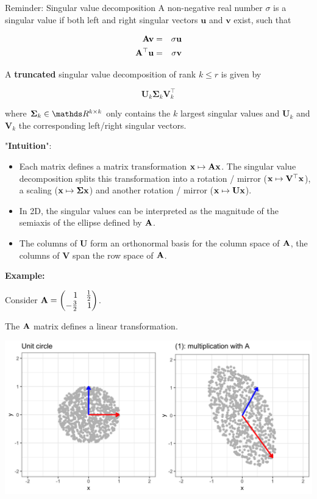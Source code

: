 \documentclass[11pt,compress,t,notes=noshow, xcolor=table]{beamer}
\begin{document}
\begin{vbframe}{Reminder: Singular value decomposition}
A non-negative real number $\sigma$ is a singular value if both left and right singular vectors $\mathbf{u}$ and $\mathbf{v}$ exist, such that

\begin{eqnarray*}
\mathbf{A} \mathbf{v} &=& \sigma \mathbf{u} \\
\mathbf{A}^\top \mathbf{u} &=& \sigma \mathbf{v}
\end{eqnarray*}


\framebreak

A \textbf{truncated} singular value decomposition of rank $k \le r$ is given by

$$
\mathbf{U}_k \boldsymbol{\Sigma}_k \mathbf{V}_k^\top
$$

where $\boldsymbol{\Sigma}_k \in \R^{k \times k}$ only contains the $k$ largest singular values and $\mathbf{U}_k$ and $\mathbf{V}_k$ the corresponding left/right singular vectors.

\framebreak

"\textbf{Intuition}":

\begin{itemize}
\item Each matrix defines a matrix transformation $\mathbf{x} \mapsto \mathbf{A} \mathbf{x}$. The singular value decomposition splits this transformation into a rotation / mirror ($\mathbf{x} \mapsto \mathbf{V}^\top \mathbf{x}$), a scaling ($\mathbf{x} \mapsto \boldsymbol{\Sigma} \mathbf{x}$) and another rotation / mirror ($\mathbf{x} \mapsto \mathbf{U}\mathbf{x}$).
\item In 2D, the singular values can be interpreted as the magnitude of the semiaxis of the ellipse defined by $\mathbf{A}$.
\item The columns of $\mathbf{U}$ form an orthonormal basis for the column space of $\mathbf{A}$, the columns of $\mathbf{V}$ span the row space of $\mathbf{A}$.
\end{itemize}

\framebreak

\textbf{Example:}

Consider $\Amat = \begin{pmatrix*}[r]
1 & \frac{1}{2} \\
- \frac{3}{2} & 1 \end{pmatrix*}$.

The $\mathbf{A}$ matrix defines a linear transformation.


\begin{center}
\includegraphics{figure_man/ignore/matrixabbildung.png}
\end{center}


\end{vbframe}
\end{document}
